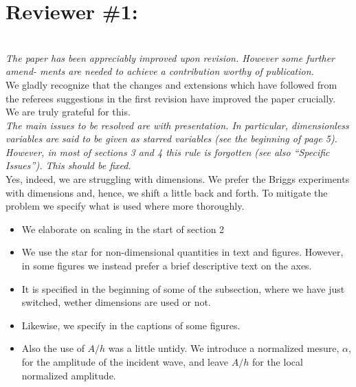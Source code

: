 \documentclass[11pt]{article}
\begin{document}
\newcommand{\refpoint}[1]{\ \vspace{0.3cm}\\ {\em #1}\  \vspace{0.3cm}\\ }
\newcommand{\refit}[1]{\em #1}
\newcommand{\refitem}[1]{\item {\em #1} }
\newcommand{\todo}[1]{\ \\ {\bf To do: #1}\\}
\section*{Reviewer \#1:} 
\refpoint{The paper has been appreciably improved upon revision. However some further amend-
ments are needed to achieve a contribution worthy of publication.}
We gladly recognize that the changes and extensions which have followed from the referees suggestions 
in the first revision have improved the paper crucially. We are truly grateful for this. 
\refpoint{The main issues to be resolved are with presentation. In particular, dimensionless
variables are said to be given as starred variables (see the beginning of page 5). However,
in most of sections 3 and 4 this rule is forgotten (see also “Specific Issues”). This should
be fixed.}
Yes, indeed, we are struggling with dimensions. We prefer the Briggs experiments with dimensions and, hence, we shift a little back and forth.
To mitigate the problem we specify what is used where more thoroughly.
\begin{itemize}
\item We elaborate on scaling in the start of section 2
\item We use the star for non-dimensional quantities in text and figures. However, in some figures we instead prefer a brief descriptive text on the axes. 
\item It is specified in the beginning of some of the subsection, where we have just switched, wether dimensions are used or not.
\item Likewise, we specify in the captions of some figures.
\item Also the use of $A/h$ was a little untidy. We introduce a normalized mesure, $\alpha$, for
the amplitude of the incident wave, and leave $A/h$ for the local normalized amplitude.
\end{itemize}
    
\end{document}
